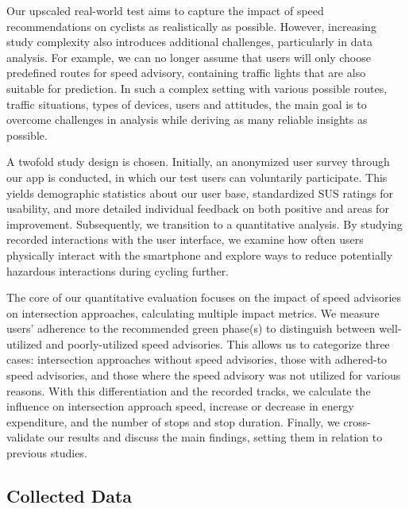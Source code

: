 Our upscaled real-world test aims to capture the impact of speed recommendations on cyclists as realistically as possible. However, increasing study complexity also introduces additional challenges, particularly in data analysis. For example, we can no longer assume that users will only choose predefined routes for speed advisory, containing traffic lights that are also suitable for prediction. In such a complex setting with various possible routes, traffic situations, types of devices, users and attitudes, the main goal is to overcome challenges in analysis while deriving as many reliable insights as possible. 

A twofold study design is chosen. Initially, an anonymized user survey through our app is conducted, in which our test users can voluntarily participate. This yields demographic statistics about our user base, standardized SUS ratings for usability, and more detailed individual feedback on both positive and areas for improvement. Subsequently, we transition to a quantitative analysis. By studying recorded interactions with the user interface, we examine how often users physically interact with the smartphone and explore ways to reduce potentially hazardous interactions during cycling further.

The core of our quantitative evaluation focuses on the impact of speed advisories on intersection approaches, calculating multiple impact metrics. We measure users' adherence to the recommended green phase(s) to distinguish between well-utilized and poorly-utilized speed advisories. This allows us to categorize three cases: intersection approaches without speed advisories, those with adhered-to speed advisories, and those where the speed advisory was not utilized for various reasons. With this differentiation and the recorded tracks, we calculate the influence on intersection approach speed, increase or decrease in energy expenditure, and the number of stops and stop duration. Finally, we cross-validate our results and discuss the main findings, setting them in relation to previous studies.

\subsection{Collected Data}

